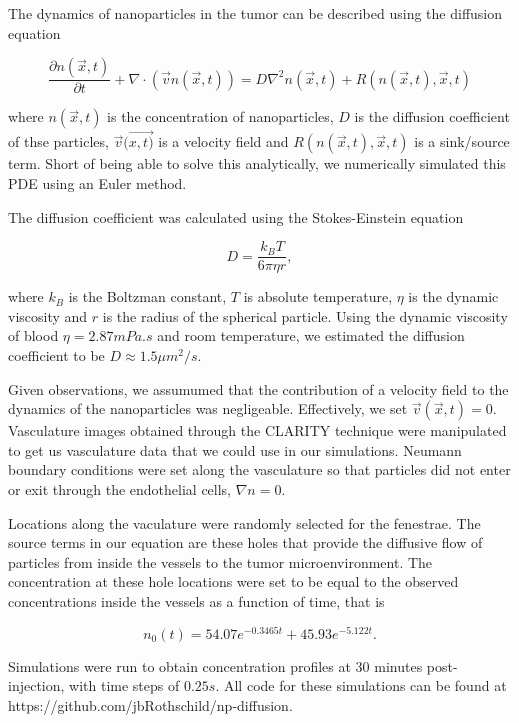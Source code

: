 The dynamics of nanoparticles in the tumor can be described using the diffusion equation

\begin{equation}\label{diffusion}
		\frac{\partial n(\vec{x},t)}{\partial t} + {\nabla \cdot (\vec{v}n(\vec{x},t)) }= D \nabla^2n(\vec{x},t) + R(n(\vec{x},t),\vec{x},t)
\end{equation}

where $n(\vec{x},t)$ is the concentration of nanoparticles, $D$ is the diffusion coefficient of thse particles, $\vec{v}(\vec{x,t)}$ is a velocity field and $R(n(\vec{x},t),\vec{x},t)$ is a sink/source term.
Short of being able to solve this analytically, we numerically simulated this PDE using an Euler method.

The diffusion coefficient was calculated using the Stokes-Einstein equation

\begin{equation}\label{conc_time}
		D = \frac{ k_B T }{ 6 \pi \eta r},
\end{equation}

where $k_B$ is the Boltzman constant, $T$ is absolute temperature, $\eta$ is the dynamic viscosity and $r$ is the radius of the spherical particle. Using the dynamic viscosity of blood $\eta = 2.87 mPa.s$ and room temperature, we estimated the diffusion coefficient to be $D \approx 1.5 \mu m^2/s$.

Given observations, we assumumed that the contribution of a velocity field to the dynamics of the nanoparticles was negligeable. 
Effectively, we set $\vec{v}(\vec{x},t)=0$.
Vasculature images obtained through the CLARITY technique were manipulated to get us vasculature data that we could use in our simulations.
Neumann boundary conditions were set along the vasculature so that particles did not enter or exit through the endothelial cells, $\nabla n = 0$.

Locations along the vaculature were randomly selected for the fenestrae.
The source terms in our equation are these holes that provide the diffusive flow of particles from inside the vessels to the tumor microenvironment.
The concentration at these hole locations were set to be equal to the observed concentrations inside the vessels as a function of time, that is

\begin{equation}\label{conc_time}
		n_0(t) = 54.07 e^{-0.3465 t} + 45.93e^{-5.122 t}.
\end{equation}

Simulations were run to obtain concentration profiles at 30 minutes post-injection, with time steps of $0.25s$.
All code for these simulations can be found at https://github.com/jbRothschild/np-diffusion.
